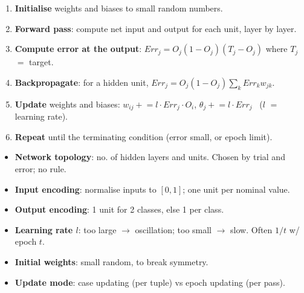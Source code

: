 \vspace{3pt}
\begin{enumerate}
  \item \textbf{Initialise} weights and biases to small random numbers.
  \item \textbf{Forward pass}: compute net input and output for each unit, layer by layer.
  \item \textbf{Compute error at the output}: $Err_j = O_j(1-O_j)(T_j - O_j)$
        where $T_j$ $=$ target.
  \item \textbf{Backpropagate}: for a hidden unit,
        $Err_j = O_j(1-O_j)\sum_k Err_k w_{jk}$.
  \item \textbf{Update} weights and biases:
        $w_{ij} \mathrel{+}= l\cdot Err_j\cdot O_i$, \quad $\theta_j \mathrel{+}= l\cdot Err_j$
        \ ($l$ $=$ learning rate).
  \item \textbf{Repeat} until the terminating condition (error small, or epoch limit).
\end{enumerate}

\vspace{3pt}
\begin{itemize}
  \item \textbf{Network topology}: no. of hidden layers and units. Chosen by trial and error;
        no rule.
  \item \textbf{Input encoding}: normalise inputs to $[0,1]$; one unit per nominal value.
  \item \textbf{Output encoding}: 1 unit for 2 classes, else 1 per class.
  \item \textbf{Learning rate $l$}: too large $\rightarrow$ oscillation; too small $\rightarrow$
        slow. Often $1/t$ w/ epoch $t$.
  \item \textbf{Initial weights}: small random, to break symmetry.
  \item \textbf{Update mode}: case updating (per tuple) vs epoch updating (per pass).
\end{itemize}

